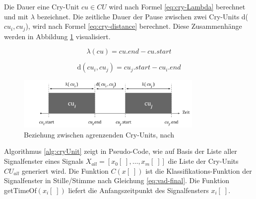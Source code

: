 Die Dauer eine Cry-Unit $cu \in CU$ wird nach Formel \ref{eq:cry-Lambda} berechnet und mit $\lambda$ bezeichnet. Die zeitliche Dauer der Pause zwischen zwei Cry-Units d($cu_i, cu_j$), wird nach Formel \ref{eq:cry-distance} berechnet. Diese Zusammenhänge werden in Abbildung \ref{img:cryUnit-details} visualisiert.\cite[S. 2]{vad_entropy}

\begin{equation}
\lambda (cu) = cu.end - cu.start
\label{eq:cry-Lambda}
\end{equation}

\begin{equation}
\text{d}(cu_i, cu_j) = cu_j.start - cu_i.end
\label{eq:cry-distance}
\end{equation}

\begin{figure}[h]
	\centering
	\includegraphics[width=0.8\textwidth]{bilder/newSmoothing05.png}
	\caption{Beziehung zwischen agrenzenden Cry-Units, nach \cite[S. 2]{vad_entropy}}
	\label{img:cryUnit-details}
\end{figure}

Algorithmus \ref{alg:cryUnit} zeigt in Pseudo-Code, wie auf Basis der Liste aller Signalfenster eines Signals $X_{all} = [x_0[\;] ,\ldots, x_m[\;]]$ die Liste der Cry-Units $CU_{all}$ generiert wird. Die Funktion $C(x[\;])$ ist die Klassifikations-Funktion der Signalfenster in Stille/Stimme nach Gleichung \ref{eq:vad-final}. Die Funktion getTimeOf$(x_i[\;])$ liefert die Anfangszeitpunkt des Signalfensters $x_i[\;]$.

